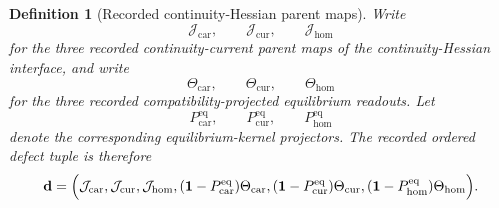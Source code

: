 \documentclass[11pt]{article}
\newcommand{\DefectTuple}{\mathbf d}
\newcommand{\Car}{\mathrm{car}}
\newcommand{\Cur}{\mathrm{cur}}
\newcommand{\Hom}{\mathrm{hom}}
\newcommand{\ObsCurrent}[1]{\mathcal J_{#1}}
\newcommand{\ObsTheta}[1]{\Theta_{#1}}
\newcommand{\EqProj}[1]{P_{#1}^{\mathrm{eq}}}
\newtheorem{definition}{Definition}
\begin{document}
\begin{definition}[Recorded continuity-Hessian parent maps]
\label{def:recorded_maps}
Write
\[
\ObsCurrent{\Car},\qquad
\ObsCurrent{\Cur},\qquad
\ObsCurrent{\Hom}
\]
for the three recorded continuity-current parent maps of the continuity-Hessian interface, and write
\[
\ObsTheta{\Car},\qquad
\ObsTheta{\Cur},\qquad
\ObsTheta{\Hom}
\]
for the three recorded compatibility-projected equilibrium readouts. Let
\[
\EqProj{\Car},\qquad
\EqProj{\Cur},\qquad
\EqProj{\Hom}
\]
denote the corresponding equilibrium-kernel projectors. The recorded ordered defect tuple is therefore
\begin{equation}
\DefectTuple
=
\Bigl(
\ObsCurrent{\Car},
\ObsCurrent{\Cur},
\ObsCurrent{\Hom},
(\mathbf 1-\EqProj{\Car})\ObsTheta{\Car},
(\mathbf 1-\EqProj{\Cur})\ObsTheta{\Cur},
(\mathbf 1-\EqProj{\Hom})\ObsTheta{\Hom}
\Bigr).
\label{eq:recorded_tuple}
\end{equation}
\end{definition}
\end{document}
